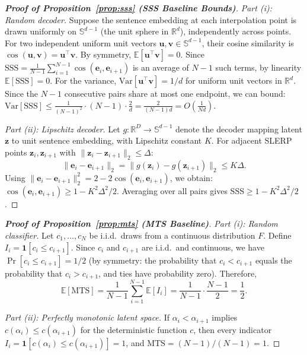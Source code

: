\documentclass{article}
\begin{document}
\begin{proof}[\textbf{Proof of Proposition~\ref{prop:sss} (SSS Baseline Bounds)}]
\emph{Part (i): Random decoder.}
Suppose the sentence embedding at each interpolation point is drawn uniformly on $\mathbb{S}^{d-1}$ (the unit sphere in $\mathbb{R}^d$), independently across points.
For two independent uniform unit vectors $\mathbf{u}, \mathbf{v} \in \mathbb{S}^{d-1}$, their cosine similarity is $\cos(\mathbf{u}, \mathbf{v}) = \mathbf{u}^\top \mathbf{v}$.
By symmetry, $\mathbb{E}[\mathbf{u}^\top \mathbf{v}] = 0$.
Since $\text{SSS} = \frac{1}{N-1}\sum_{i=1}^{N-1} \cos(\mathbf{e}_i, \mathbf{e}_{i+1})$ is an average of $N{-}1$ such terms, by linearity $\mathbb{E}[\text{SSS}] = 0$.
For the variance, $\text{Var}[\mathbf{u}^\top \mathbf{v}] = 1/d$ for uniform unit vectors in $\mathbb{R}^d$.
Since the $N{-}1$ consecutive pairs share at most one endpoint, we can bound:
$\text{Var}[\text{SSS}] \leq \frac{1}{(N-1)^2} \cdot (N{-}1) \cdot \frac{2}{d} = \frac{2}{(N-1)d} = O\!\left(\frac{1}{Nd}\right)$.

\emph{Part (ii): Lipschitz decoder.}
Let $g: \mathbb{R}^D \to \mathbb{S}^{d-1}$ denote the decoder mapping latent $\mathbf{z}$ to unit sentence embedding, with Lipschitz constant $K$.
For adjacent SLERP points $\mathbf{z}_i, \mathbf{z}_{i+1}$ with $\|\mathbf{z}_i - \mathbf{z}_{i+1}\|_2 \leq \Delta$:
\[
\|\mathbf{e}_i - \mathbf{e}_{i+1}\|_2 = \|g(\mathbf{z}_i) - g(\mathbf{z}_{i+1})\|_2 \leq K\Delta.
\]
Using $\|\mathbf{e}_i - \mathbf{e}_{i+1}\|_2^2 = 2 - 2\cos(\mathbf{e}_i, \mathbf{e}_{i+1})$, we obtain:
$\cos(\mathbf{e}_i, \mathbf{e}_{i+1}) \geq 1 - K^2\Delta^2/2$.
Averaging over all pairs gives $\text{SSS} \geq 1 - K^2\Delta^2/2$.
\end{proof}

\begin{proof}[\textbf{Proof of Proposition~\ref{prop:mts} (MTS Baseline)}]
\emph{Part (i): Random classifier.}
Let $c_1, \ldots, c_N$ be i.i.d.\ draws from a continuous distribution $F$.
Define $I_i = \mathbf{1}[c_i \leq c_{i+1}]$.
Since $c_i$ and $c_{i+1}$ are i.i.d.\ and continuous, we have $\Pr[c_i \leq c_{i+1}] = 1/2$ (by symmetry: the probability that $c_i < c_{i+1}$ equals the probability that $c_i > c_{i+1}$, and ties have probability zero).
Therefore,
\[
\mathbb{E}[\text{MTS}] = \frac{1}{N-1}\sum_{i=1}^{N-1}\mathbb{E}[I_i] = \frac{1}{N-1}\cdot\frac{N-1}{2} = \frac{1}{2}.
\]

\emph{Part (ii): Perfectly monotonic latent space.}
If $\alpha_i < \alpha_{i+1}$ implies $c(\alpha_i) \leq c(\alpha_{i+1})$ for the deterministic function $c$, then every indicator $I_i = \mathbf{1}[c(\alpha_i) \leq c(\alpha_{i+1})] = 1$, and $\text{MTS} = (N{-}1)/(N{-}1) = 1$.
\end{proof}
\end{document}
